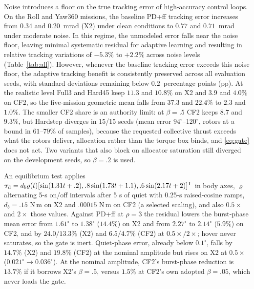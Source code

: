 \documentclass[letterpaper, 10 pt, conference]{ieeeconf}
\newcommand{\T}{^{\mathsf T}}
\begin{document}
Noise introduces a floor on the true tracking error of high-accuracy control loops. On the Roll and Yaw360 missions, the baseline PD+ff tracking error increases from $0.34$ and $0.20$~mrad (X2) under clean conditions to $0.77$ and $0.71$~mrad under moderate noise. In this regime, the unmodeled error falls near the noise floor, leaving minimal systematic residual for adaptive learning and resulting in relative tracking variations of $-5.3\%$ to $+2.2\%$ across noise levels (Table~\ref{tab:all}). However, whenever the baseline tracking error exceeds this noise floor, the adaptive tracking benefit is consistently preserved across all evaluation seeds, with standard deviations remaining below $0.2$~percentage points (pp). At the realistic level Full3 and Hard45 keep $11.3$ and $10.8\%$ on X2 and $3.9$ and $4.0\%$ on CF2, so the five-mission geometric mean falls from $37.3$ and $22.4\%$ to $2.3$ and $1.0\%$. The smaller CF2 share is an authority limit: at $\beta=.5$ CF2 keeps $8.7$ and $9.3\%$, but Hardstep diverges in 15/15 seeds (mean error $94^\circ$--$120^\circ$, rotors at a bound in $61$--$79\%$ of samples), because the requested collective thrust exceeds what the rotors deliver, allocation rather than the torque box binds, and \eqref{eq:gate} does not act. Two variants that also block on allocator saturation still diverged on the development seeds, so $\beta=.2$ is used.

\label{sec:disturbance}

An equilibrium test applies $\bm\tau_{\rm d}=d_b\varrho(t)[\sin(1.31t+.2),\allowbreak .8\sin(1.73t+1.1),\allowbreak.6\sin(2.17t+2)]\T$ in body axes, $\varrho$ alternating 5-s on/off intervals after 5 s of quiet with 0.25-s raised-cosine ramps, $d_b=.15$ N\,m on X2 and $.00015$ N\,m on CF2 (a selected scaling), and also $0.5\times$ and $2\times$ those values. Against PD+ff at $\rho=3$ the residual lowers the burst-phase mean error from $1.61^\circ$ to $1.38^\circ$ ($14.4\%$) on X2 and from $2.27^\circ$ to $2.14^\circ$ ($5.9\%$) on CF2, and by $24.0/13.3\%$ (X2) and $6.5/4.7\%$ (CF2) at $0.5\times/2\times$; hover never saturates, so the gate is inert. Quiet-phase error, already below $0.1^\circ$, falls by $14.7\%$ (X2) and $19.8\%$ (CF2) at the nominal amplitude but rises on X2 at $0.5\times$ ($0.021^\circ\to0.036^\circ$). At the nominal amplitude, CF2's burst-phase reduction is $13.7\%$ if it borrows X2's $\beta=.5$, versus $1.5\%$ at CF2's own adopted $\beta=.05$, which never loads the gate.

\end{document}
